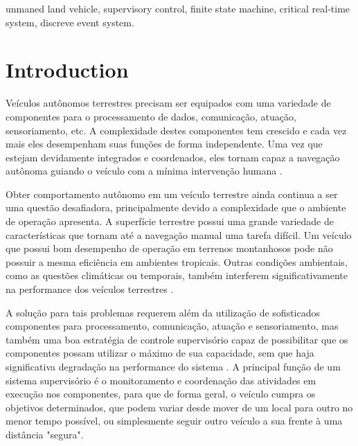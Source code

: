 \documentclass[conference]{IEEEtran}
\begin{document}
\begin{IEEEkeywords}
unmaned land vehicle, supervisory control, finite state machine, critical real-time system, discreve event system.
\end{IEEEkeywords}


\IEEEpeerreviewmaketitle
\section{Introduction}\label{sec:introduction}
Veículos autônomos terrestres precisam ser equipados com uma variedade de componentes para o processamento de dados, comunicação, atuação, sensoriamento, etc. A complexidade destes componentes tem crescido e cada vez mais eles desempenham suas funções de forma independente. Uma vez que estejam devidamente integrados e coordenados, eles tornam capaz a navegação autônoma guiando o veículo com a mínima intervenção humana \cite{autonomous_Hebert:1997:IUG:523961} \cite{autonomous_doi:10.1117/12.391642}.

Obter comportamento autônomo em um veículo terrestre ainda continua a ser uma questão desafiadora, principalmente devido a complexidade que o ambiente de operação apresenta. A superfície terrestre possui uma grande variedade de características que tornam até a navegação manual uma tarefa difícil. Um veículo que possui bom desempenho de operação em terrenos montanhosos pode não possuir a mesma eficiência em ambientes tropicais. Outras condições ambientais, como as questões climáticas ou temporais, também interferem significativamente na performance dos veículos terrestres \cite{supervisory_Donmez:2010:MSE:2377576.2377580}. 

A solução para tais problemas requerem além da utilização de sofisticados componentes para processamento, comunicação, atuação e sensoriamento, mas também uma boa estratégia de controle supervisório capaz de possibilitar que os componentes possam utilizar o máximo de sua capacidade, sem que haja significativa degradação na performance do sistema \cite{supervisory_Cummings_1a}. A principal função de um sistema supervisório é o monitoramento e coordenação das atividades em execução nos componentes, para que de forma geral, o veículo cumpra os objetivos determinados, que podem variar desde mover de um local para outro no menor tempo possível, ou simplesmente seguir outro veículo a sua frente à uma distância "segura". 
\end{document}
